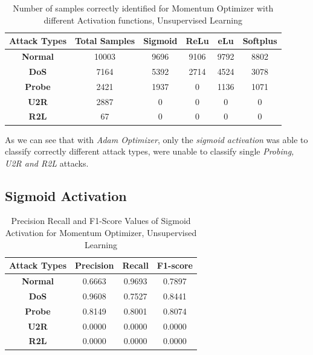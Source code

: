 \documentclass[12pt, a4paper]{report}
\begin{document}
\begin{appendices}
	\begin{table}[ht]
	\centering
	\captionsetup{justification=centering,margin=2cm}
	\begin{tabular}{|c|c|c|c|c|c|}
	\hline
	\textbf{Attack Types} & \textbf{Total Samples} & \textbf{Sigmoid} & \textbf{ReLu} & \textbf{eLu} & \textbf{Softplus} \\ \hline
	\textbf{Normal}       & 10003                  & 9696            & 9106         & 9792        & 8802           \\ \hline
	\textbf{DoS}          & 7164                  & 5392            & 2714         & 4524        & 3078             \\ \hline
	\textbf{Probe}        & 2421                  & 1937             & 0          & 1136         & 1071              \\ \hline
	\textbf{U2R}          & 2887                    & 0             & 0           & 0          & 0               \\ \hline
	\textbf{R2L}          & 67                     & 0               & 0            & 0           & 0                \\ \hline
	\end{tabular}
	\caption{Number of samples correctly identified for Momentum Optimizer with different Activation functions, Unsupervised Learning}
	\label{confusion_sgd_tf}
	\end{table}
  
  As we can see that with \textit{Adam Optimizer}, only the \textit{sigmoid activation} was able to classify correctly different attack types, were unable to classify single \textit{Probing, U2R and R2L} attacks.
   
   \subsection{Sigmoid Activation}
 	 \begin{table}[ht]
		\centering
		\captionsetup{justification=centering,margin=2cm}
		\begin{tabular}{|c|c|c|c|}
		\hline
		\textbf{Attack Types} & \textbf{Precision} & \textbf{Recall} & \textbf{F1-score} \\ \hline
		\textbf{Normal}       & 0.6663             & 0.9693          & 0.7897            \\ \hline
		\textbf{DoS}          & 0.9608             & 0.7527          & 0.8441            \\ \hline
		\textbf{Probe}        & 0.8149             & 0.8001          & 0.8074            \\ \hline
		\textbf{U2R}          & 0.0000             & 0.0000          & 0.0000            \\ \hline
		\textbf{R2L}          & 0.0000             & 0.0000          & 0.0000            \\ \hline
		\end{tabular}
		\caption{Precision Recall and F1-Score Values of Sigmoid Activation for Momentum Optimizer, Unsupervised Learning}
		\label{classification sigmoid sgd tf}
		\end{table} 
  

\end{appendices}
\end{document}
